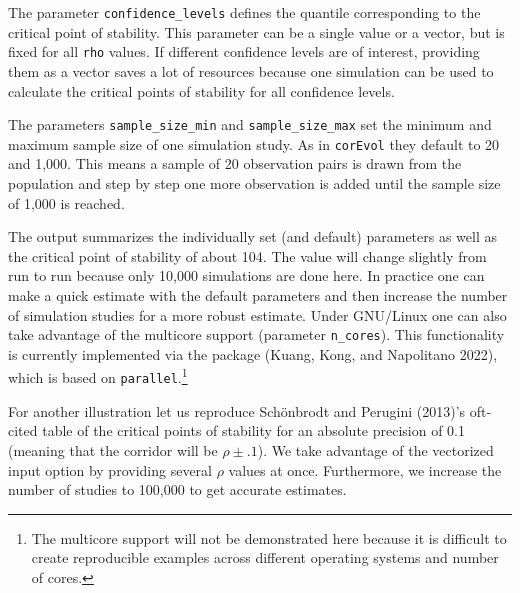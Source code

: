 The parameter \texttt{confidence\_levels} defines the quantile corresponding to the critical point of stability. This parameter can be a single value or a vector, but is fixed for all \texttt{rho} values. If different confidence levels are of interest, providing them as a vector saves a lot of resources because one simulation can be used to calculate the critical points of stability for all confidence levels.

The parameters \texttt{sample\_size\_min} and \texttt{sample\_size\_max} set the minimum and maximum sample size of one simulation study. As in \texttt{corEvol} they default to 20 and 1,000. This means a sample of 20 observation pairs is drawn from the population and step by step one more observation is added until the sample size of 1,000 is reached.

The output summarizes the individually set (and default) parameters as well as the critical point of stability of about 104. The value will change slightly from run to run because only 10,000 simulations are done here. In practice one can make a quick estimate with the default parameters and then increase the number of simulation studies for a more robust estimate. Under GNU/Linux one can also take advantage of the multicore support (parameter \texttt{n\_cores}). This functionality is currently implemented via the  package (Kuang, Kong, and Napolitano 2022), which is based on \texttt{parallel}.\footnote{The multicore support will not be demonstrated here because it is difficult to create reproducible examples across different operating systems and number of cores.}

For another illustration let us reproduce Schönbrodt and Perugini (2013)'s oft-cited table of the critical points of stability for an absolute precision of 0.1 (meaning that the corridor will be \(\rho\pm.1\)). We take advantage of the vectorized input option by providing several \(\rho\) values at once. Furthermore, we increase the number of studies to 100,000 to get accurate estimates.


